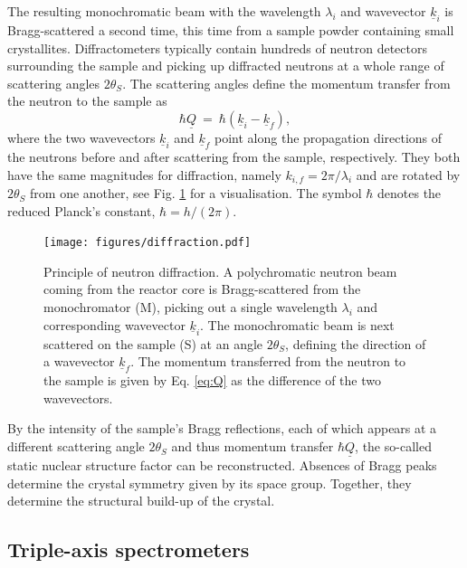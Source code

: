 The resulting monochromatic beam with the wavelength $\lambda_i$ and wavevector $\underline{k}_i$ is Bragg-scattered a second time, this time from a sample powder containing small crystallites. Diffractometers typically contain hundreds of neutron detectors surrounding the sample and picking up diffracted neutrons at a whole range of scattering angles $2 \theta_S$. The scattering angles define the momentum transfer from the neutron to the sample as \cite[p. 11]{Shirane2002}
\begin{equation}
	\label{eq:Q}
	\hbar \underline{Q} \ =\  \hbar \left( \underline{k}_i - \underline{k}_f \right),
\end{equation}
where the two wavevectors $\underline{k}_i$ and $\underline{k}_f$ point along the propagation directions of the neutrons before and after scattering from the sample, respectively. They both have the same magnitudes for diffraction, namely $k_{i,f} = 2\pi / \lambda_i$ and are rotated by $2\theta_S$ from one another, see Fig. \ref{fig:diffraction} for a visualisation. The symbol $\hbar$ denotes the reduced Planck's constant, $\hbar = h / \left( 2\pi \right)$.

\begin{figure}[htb]
	\centering
	\texttt{[image: figures/diffraction.pdf]}
	\caption[Neutron diffraction.]{
		Principle of neutron diffraction. A polychromatic neutron beam coming from the reactor core is Bragg-scattered from the monochromator (M), picking out a single wavelength $\lambda_i$ and corresponding wavevector $\underline{k}_i$. The monochromatic beam is next scattered on the sample (S) at an angle $2\theta_S$, defining the direction of a wavevector $\underline{k}_f$. The momentum transferred from the neutron to the sample is given by Eq. \ref{eq:Q} as the difference of the two wavevectors.}
	\label{fig:diffraction}
\end{figure}

By the intensity of the sample's Bragg reflections, each of which appears at a different scattering angle $2\theta_S$ and thus momentum transfer $\hbar \underline{Q}$, the so-called static nuclear structure factor \cite[p. 25]{Shirane2002} can be reconstructed. Absences of Bragg peaks determine the crystal symmetry given by its space group. Together, they determine the structural build-up of the crystal.


\subsection{Triple-axis spectrometers}

